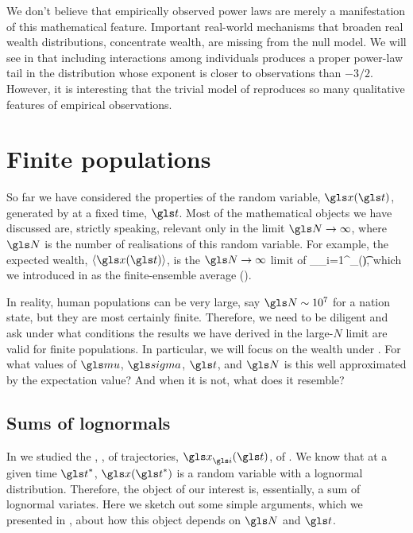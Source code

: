 
We don't believe that empirically observed power laws are merely a manifestation of this mathematical feature. Important real-world mechanisms that broaden real wealth distributions, \ie concentrate wealth, are missing from the null model. We will see in  that including interactions among individuals produces a proper power-law tail in the distribution whose exponent is closer to observations than $-3/2$. However, it is interesting that the trivial model of \GBM reproduces so many qualitative features of empirical observations. 


\section{Finite populations}
So far we have considered the properties of the random variable, $\x(\t)$, generated by \GBM at a fixed time, $\t$. Most of the mathematical objects we have discussed are, strictly speaking, relevant only in the limit $\N\to\infty$, where $\N$ is the number of realisations of this random variable. For example, the expected wealth, $\ave{\x(\t)}$, is the $\N\to\infty$ limit of
\be
\ave{\x(\t)}_\N \equiv {}\sum_{i=1}^\N \x_\gi(\t),
\ee
which we introduced in  as the finite-ensemble average (\FEA).

In reality, human populations can be very large, say $\N\sim10^7$ for a nation state, but they are most certainly finite. Therefore, we need to be diligent and ask under what conditions the results we have derived in the large-$N$ limit are valid for finite populations. In particular, we will focus on the \FEA wealth under \GBM. For what values of $\gmu$, $\gsigma$, $\t$, and $\N$ is this well approximated by the expectation value? And when it is not, what does it resemble?

\subsection{Sums of lognormals}
In \cite{PetersKlein2013} we studied the \FEA, , of trajectories, $\x_\gi(\t)$, of \GBM. We know that at a given time $\t^\ast$, $\x(\t^\ast)$ is a random variable with a lognormal distribution. Therefore, the object of our interest is, essentially, a sum of lognormal variates. Here we sketch out some simple arguments, which we presented in \cite{PetersAdamou2018b}, about how this object depends on $\N$ and $\t$.

